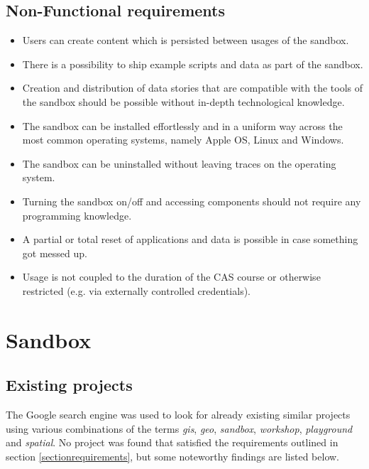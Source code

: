 \documentclass[11pt, a4paper, oneside, parskip=full-]{scrartcl}
\begin{document}
\subsection{Non-Functional requirements}
\begin{itemize}
  \item Users can create content which is persisted between usages of the
  sandbox.
  \item There is a possibility to ship example scripts and data as part of the
  sandbox.
  \item Creation and distribution of data stories that are compatible with the
  tools of the sandbox should be possible without in-depth technological
  knowledge.
  \item The sandbox can be installed effortlessly and in a uniform way across
  the most common operating systems, namely Apple OS, Linux and Windows.
  \item The sandbox can be uninstalled without leaving traces on the operating
  system.
  \item Turning the sandbox on/off and accessing components should not require
  any programming knowledge.
  \item A partial or total reset of applications and data is possible in case
  something got messed up.
  \item Usage is not coupled to the duration of the CAS course or otherwise
  restricted (e.g. via externally controlled credentials).
\end{itemize}

\section{Sandbox}

\subsection{Existing projects}
The Google search engine was used to look for already existing similar projects
using various combinations of the terms \emph{gis}, \emph{geo}, \emph{sandbox},
\emph{workshop}, \emph{playground} and \emph{spatial}. No project was found that
satisfied the requirements outlined in section \ref{sectionrequirements}, but
some noteworthy findings are listed below.
\end{document}
